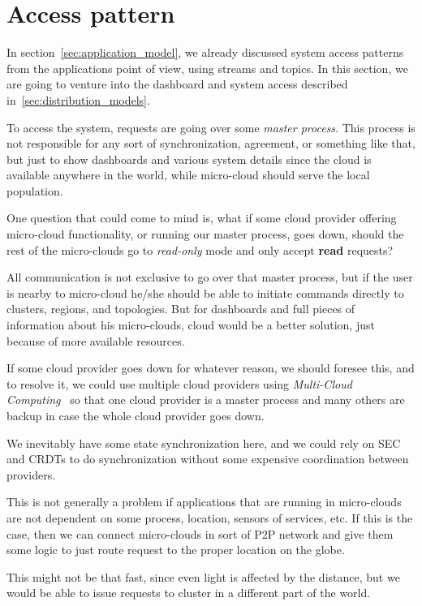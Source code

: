 \section{Access pattern}\label{sec:access_pattern}
%
In section~\ref{sec:application_model}, we already discussed system access patterns from the applications point of view, using streams and topics. In this section, we are going to venture into the dashboard and system access described in~\ref{sec:distribution_models}. 

To access the system, requests are going over some \textit{master process}. This process is not responsible for any sort of synchronization, agreement, or something like that, but just to show dashboards and various system details since the cloud is available anywhere in the world, while micro-cloud should serve the local population. 

One question that could come to mind is, what if some cloud provider offering micro-cloud functionality, or running our master process, goes down, should the rest of the micro-clouds go to \textit{read-only} mode and only accept \textbf{read} requests?

All communication is not exclusive to go over that master process, but if the user is nearby to micro-cloud he/she should be able to initiate commands directly to clusters, regions, and topologies. But for dashboards and full pieces of information about his micro-clouds, cloud would be a better solution, just because of more available resources.

If some cloud provider goes down for whatever reason, we should foresee this, and to resolve it, we could use multiple cloud providers using \textit{Multi-Cloud Computing}~\cite{HongDSH19, Ardagna15} so that one cloud provider is a master process and many others are backup in case the whole cloud provider goes down.

We inevitably have some state synchronization here, and we could rely on SEC and CRDTs to do synchronization without some expensive coordination between providers.

This is not generally a problem if applications that are running in micro-clouds are not dependent on some process, location, sensors of services, etc. If this is the case, then we can connect micro-clouds in sort of P2P network and give them some logic to just route request to the proper location on the globe. 

This might not be that fast, since even light is affected by the distance, but we would be able to issue requests to cluster in a different part of the world.
%
%

